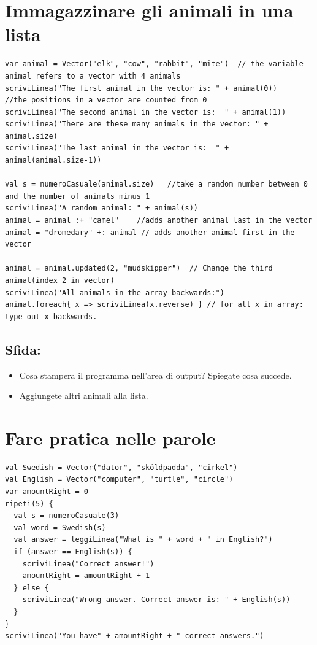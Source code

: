 \chapter{Immagazzinare gli animali in una lista}
\begin{lstlisting}[basicstyle={\ttfamily\fontsize{14}{17}\selectfont},numbers=none]
var animal = Vector("elk", "cow", "rabbit", "mite")  // the variable animal refers to a vector with 4 animals
scriviLinea("The first animal in the vector is: " + animal(0))     //the positions in a vector are counted from 0
scriviLinea("The second animal in the vector is:  " + animal(1))
scriviLinea("There are these many animals in the vector: " + animal.size)
scriviLinea("The last animal in the vector is:  " + animal(animal.size-1))

val s = numeroCasuale(animal.size)   //take a random number between 0 and the number of animals minus 1
scriviLinea("A random animal: " + animal(s))
animal = animal :+ "camel"    //adds another animal last in the vector
animal = "dromedary" +: animal // adds another animal first in the vector

animal = animal.updated(2, "mudskipper")  // Change the third animal(index 2 in vector)
scriviLinea("All animals in the array backwards:")
animal.foreach{ x => scriviLinea(x.reverse) } // for all x in array: type out x backwards.
\end{lstlisting}
        
\section*{\color{BrickRed}Sfida:}


\begin{itemize}

\item {Cosa stampera il programma nell'area di output? Spiegate cosa succede.}
\item {Aggiungete altri animali alla lista.}

\end{itemize}


\chapter{Fare pratica nelle parole}
\begin{lstlisting}[basicstyle={\ttfamily\fontsize{14}{17}\selectfont},numbers=none]
val Swedish = Vector("dator", "sköldpadda", "cirkel")
val English = Vector("computer", "turtle", "circle")
var amountRight = 0
ripeti(5) {
  val s = numeroCasuale(3)
  val word = Swedish(s)
  val answer = leggiLinea("What is " + word + " in English?")
  if (answer == English(s)) {
    scriviLinea("Correct answer!")
    amountRight = amountRight + 1
  } else {
    scriviLinea("Wrong answer. Correct answer is: " + English(s))
  }
}
scriviLinea("You have" + amountRight + " correct answers.")
\end{lstlisting}
        
